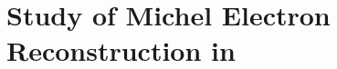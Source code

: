 \chapter{\label{ch:michel}Study of Michel Electron Reconstruction in \protodune{}} 

%
% 
% 
% 
% 
% 
%

